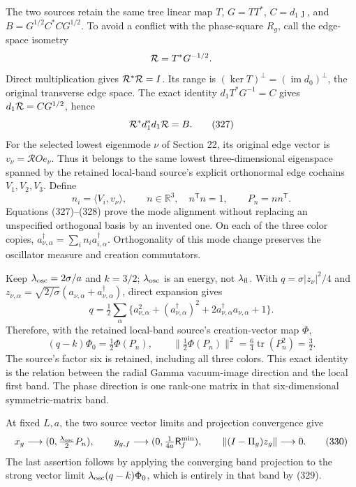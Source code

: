 \documentclass[
  11pt,
]{article}
\begin{document}
The two sources retain the same tree linear map \(T\), \(G=TT^*\),
\(C=d_1\jmath\), and \(B=G^{1/2}C^*CG^{1/2}\). To avoid a conflict with
the phase-square \(R_g\), call the edge-space isometry \[
 {\cal R}=T^*G^{-1/2}.
\] Direct multiplication gives \({\cal R}^*{\cal R}=I\). Its range is
\((\ker T)^\perp=(\operatorname{im}d_0)^\perp\), the original transverse
edge space. The exact identity \(d_1T^*G^{-1}=C\) gives
\(d_1{\cal R}=CG^{1/2}\), hence \[
 {\cal R}^*d_1^*d_1{\cal R}=B.
 \tag{327}
\] For the selected lowest eigenmode \(\nu\) of Section 22, its original
edge vector is \(v_\nu=\mathcal R Oe_\nu\). Thus it belongs to the same
lowest three-dimensional eigenspace spanned by the retained local-band
source's explicit orthonormal edge cochains \(V_1,V_2,V_3\). Define \[
 n_i=\langle V_i,v_\nu\rangle,\qquad
 n\in\mathbb R^3,\quad n^{\mathsf T}n=1,\qquad P_n=nn^{\mathsf T}.
 \tag{328}
\] Equations (327)--(328) prove the mode alignment without replacing an
unspecified orthogonal basis by an invented one. On each of the three
color copies,
\(a_{\nu,\alpha}^\dagger=\sum_i n_i a_{i,\alpha}^\dagger\).
Orthogonality of this mode change preserves the oscillator measure and
creation commutators.

Keep \(\lambda_{\rm osc}=2\sigma/a\) and \(k=3/2\);
\(\lambda_{\rm osc}\) is an energy, not \(\lambda_{\rm fl}\). With
\(q=\sigma|z_\nu|^2/4\) and
\(z_{\nu,\alpha}=\sqrt{2/\sigma}(a_{\nu,\alpha}+a_{\nu,\alpha}^\dagger)\),
direct expansion gives \[
 q=\tfrac12\sum_\alpha
 \{a_{\nu,\alpha}^2+(a_{\nu,\alpha}^\dagger)^2
                    +2a_{\nu,\alpha}^\dagger a_{\nu,\alpha}+1\}.
\] Therefore, with the retained local-band source's creation-vector map
\(\Phi\), \[
 (q-k)\Phi_0=\tfrac12\Phi(P_n),\qquad
 \|\tfrac12\Phi(P_n)\|^2=\tfrac64\operatorname{tr}(P_n^2)=\tfrac32.
 \tag{329}
\] The source's factor six is retained, including all three colors. This
exact identity is the relation between the radial Gamma vacuum-image
direction and the local first band. The phase direction is one rank-one
matrix in that six-dimensional symmetric-matrix band.

At fixed \(L,a\), the two source vector limits and projection
convergence give \[
 x_g\longrightarrow (0,\tfrac{\lambda_{\rm osc}}2P_n),\qquad
 y_{g,f}\longrightarrow(0,\tfrac1{4a}{\mathsf R}_f^{\min}),\qquad
 \|(I-\Pi_g)z_g\|\longrightarrow0.
 \tag{330}
\] The last assertion follows by applying the converging band projection
to the strong vector limit \(\lambda_{\rm osc}(q-k)\Phi_0\), which is
entirely in that band by (329).
\end{document}
